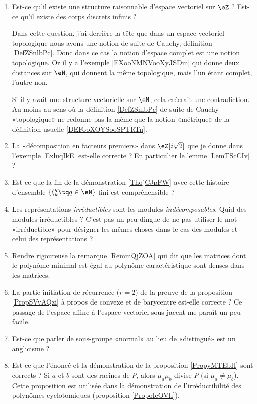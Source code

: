 \begin{enumerate}
    \item
        Est-ce qu'il existe une structure raisonnable d'espace vectoriel sur \( \eZ\) ? Est-ce qu'il existe des corps discrets infinis ? 

        Dans cette question, j'ai derrière la tête que dans un espace vectoriel topologique nous avons une notion de suite de Cauchy, définition \ref{DefZSnlbPc}. Donc dans ce cas la notion d'espace complet est une notion topologique. Or il y a l'exemple \ref{EXooNMNVooXyJSDm} qui donne deux distances sur \( \eN\), qui donnent la même topologique, mais l'un étant complet, l'autre non.

        Si il y avait une structure vectorielle sur \( \eN\), cela créerait une contradiction. Au moins au sens où la définition \ref{DefZSnlbPc} de suite de Cauchy «topologique» ne redonne pas la même que la notion «métrique» de la définition usuelle \ref{DEFooXOYSooSPTRTn}.
    \item
        La «décomposition en facteurs premiers» dans \( \eZ[i\sqrt{2}]\) que je donne dans l'exemple \ref{ExluqIkE} est-elle correcte ? En particulier le lemme \ref{LemTScCIv} ?
    \item
        Est-ce que la fin de la démonstration \ref{ThojCJpFW} avec cette histoire d'ensemble \( \{ \xi_k^q\tq q\in \eN \}\) fini est compréhensible ?
    \item
        Les représentations \emph{irréductibles} sont les modules \emph{indécomposables}. Quid des modules irréductibles ? C'est pas un peu dingue de ne pas utiliser le mot «irréductible» pour désigner les mêmes choses dans le cas des modules et celui des représentations ?
    \item
        Rendre rigoureuse la remarque \eqref{RemmQjZOA} qui dit que les matrices dont le polynôme minimal est égal au polynôme caractéristique sont denses dans les matrices.
    \item
        La partie initiation de récurrence (\( r=2\)) de la preuve de la proposition \ref{PropSVvAQzi} à propos de convexe et de barycentre est-elle correcte ? Ce passage de l'espace affine à l'espace vectoriel sous-jacent me paraît un peu facile.
    \item
        Est-ce que parler de sous-groupe «normal» au lieu de «distingué» est un anglicisme ?
    \item
        Est-ce que l'énoncé et la démonstration de la proposition \ref{PropyMTEbH} sont corrects ? Si \( a\) et \( b\) sont des racines de \( P\), alors \( \mu_a\mu_b\) divise \( P\) (si \( \mu_a\neq \mu_b\)). Cette proposition est utilisée dans la démonstration de l'irréductibilité des polynômes cyclotomiques (proposition \ref{PropoIeOVh}).

\end{enumerate}
